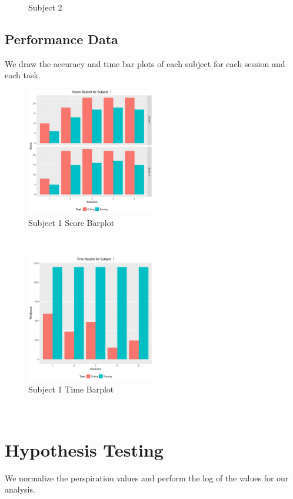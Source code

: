 \documentclass[12pt,epsf]{report}
\begin{document}
\begin{figure}[!htb]
\begin{minipage}[c]{0.5\linewidth}
	\caption{Subject 2}
	\end{minipage}
\end{figure}
\FloatBarrier
\subsection*{Performance Data}
We draw the accuracy and time bar plots of each subject for each session and each task.\\
\begin{figure}[!htb]
	\centering
	\includegraphics[width=0.5\textwidth]{1_Score_barplot.pdf}
	\caption{Subject 1 Score Barplot}
	\centering
\end{figure}
\\
\begin{figure}[!htb]
	\centering
	\includegraphics[width=0.5\textwidth]{1_Time_barplot.pdf}
	\caption{Subject 1 Time Barplot}
	\centering
\end{figure}\\
\section*{Hypothesis Testing}
We normalize the perspiration values and perform the log of the values for our analysis.\\
\end{document}

